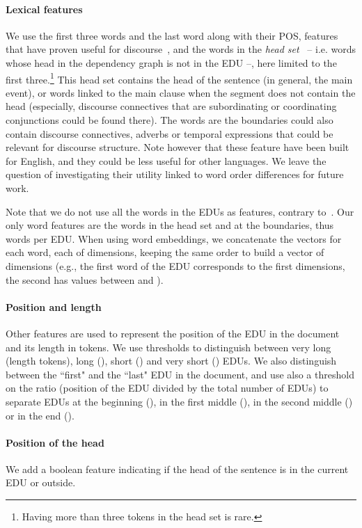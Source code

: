 \documentclass[11pt]{article}
\begin{document}
\paragraph{Lexical features}
We use the first three words and the last word along with their POS, features that have proven useful for discourse~\cite{pitler:automati:2009}, and the words in the \emph{head set}~\cite{sagae:analysis:2009} -- i.e. words whose head in the dependency graph is not in the EDU --, here limited to the first three.\footnote{Having more than three tokens in the head set is rare.} 
This head set contains the head of the sentence (in general, the main event), or words linked to the main clause when the segment does not contain the head (especially, discourse connectives that are subordinating or coordinating conjunctions could be found there).
The words are the boundaries could also contain discourse connectives, adverbs or temporal expressions that could be relevant for discourse structure.
Note however that these feature have been built for English, and they could be less useful for other languages.
We leave the question of investigating their utility linked to word order differences for future work.

Note that we do not use all the words in the EDUs as features, contrary to~\cite{li:recursive:2014,ji:representation:2014}. 
Our only word features are the words in the head set and at the boundaries, thus  words per EDU.
When using word embeddings, we concatenate the vectors for each word, each of  dimensions, keeping the same order to build a vector of  dimensions (e.g., the first word of the EDU corresponds to the first  dimensions, the second has values between  and ). 

\paragraph{Position and length}
Other features are used to represent the position of the EDU in the document and its length in tokens.
We use thresholds to distinguish between very long (length  tokens), long (), short () and very short () EDUs. 
We also distinguish between the ``first" and the ``last" EDU in the document, and use also a threshold on the ratio (position of the EDU divided by the total number of EDUs) to separate EDUs at the beginning (), in the first middle (), in the second middle () or in the end (). 

\paragraph{Position of the head}
We add a boolean feature indicating if the head of the sentence is in the current EDU or outside.
\end{document}
